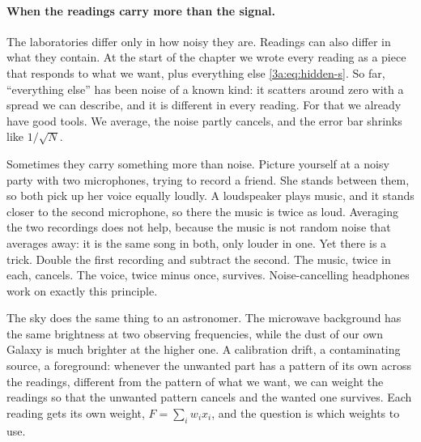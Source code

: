 \paragraph{When the readings carry more than the signal.}
The laboratories differ only in how noisy they are. Readings can also
differ in what they contain. At the start of the chapter we wrote every reading as a piece that responds
to what we want, plus everything else \eqref{3a:eq:hidden-s}. So far,
``everything else'' has been noise of a known kind: it scatters around zero
with a spread we can describe, and it is different in every reading. For
that we already have good tools. We average, the noise partly cancels, and
the error bar shrinks like $1/\sqrt N$.

Sometimes they carry something more than noise. Picture yourself at a
noisy party with two microphones, trying to record a friend. She stands
between them, so both pick up her voice equally loudly. A loudspeaker plays
music, and it stands closer to the second microphone, so there the music is
twice as loud. Averaging the two recordings does not help, because the music
is not random noise that averages away: it is the same song in both, only
louder in one. Yet there is a trick. Double the first recording and subtract
the second. The music, twice in each, cancels. The voice, twice minus once,
survives. Noise-cancelling headphones work on exactly this principle.

The sky does the same thing to an astronomer. The microwave background has
the same brightness at two observing frequencies, while the dust of our own
Galaxy is much brighter at the higher one. A calibration drift, a
contaminating source, a foreground: whenever the unwanted part has a pattern
of its own across the readings, different from the pattern of what we want,
we can weight the readings so that the unwanted pattern cancels and the
wanted one survives. Each reading gets its own weight, $F=\sum_iw_ix_i$, and
the question is which weights to use.

